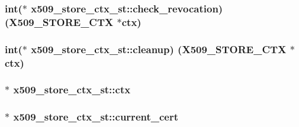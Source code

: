 \subsubsection[{\texorpdfstring{check\+\_\+revocation}{check_revocation}}]{\setlength{\rightskip}{0pt plus 5cm}int($\ast$ x509\+\_\+store\+\_\+ctx\+\_\+st\+::check\+\_\+revocation) ({\bf X509\+\_\+\+S\+T\+O\+R\+E\+\_\+\+C\+TX} $\ast${\bf ctx})}\hypertarget{structx509__store__ctx__st_a15bc54f186c068f3eb8a256d696c6fce}{}\label{structx509__store__ctx__st_a15bc54f186c068f3eb8a256d696c6fce}
\subsubsection[{\texorpdfstring{cleanup}{cleanup}}]{\setlength{\rightskip}{0pt plus 5cm}int($\ast$ x509\+\_\+store\+\_\+ctx\+\_\+st\+::cleanup) ({\bf X509\+\_\+\+S\+T\+O\+R\+E\+\_\+\+C\+TX} $\ast${\bf ctx})}\hypertarget{structx509__store__ctx__st_a71d8056c414256fb63ccabd32f8e29d6}{}\label{structx509__store__ctx__st_a71d8056c414256fb63ccabd32f8e29d6}
\subsubsection[{\texorpdfstring{ctx}{ctx}}]{$\ast$ x509\+\_\+store\+\_\+ctx\+\_\+st\+::ctx}\hypertarget{structx509__store__ctx__st_ac633a0b046f10408d0becf0f1732ede5}{}\label{structx509__store__ctx__st_ac633a0b046f10408d0becf0f1732ede5}
\subsubsection[{\texorpdfstring{current\+\_\+cert}{current_cert}}]{$\ast$ x509\+\_\+store\+\_\+ctx\+\_\+st\+::current\+\_\+cert}\hypertarget{structx509__store__ctx__st_adbbabe6efb4ed9745801ba73ac6e4f25}{}\label{structx509__store__ctx__st_adbbabe6efb4ed9745801ba73ac6e4f25}

